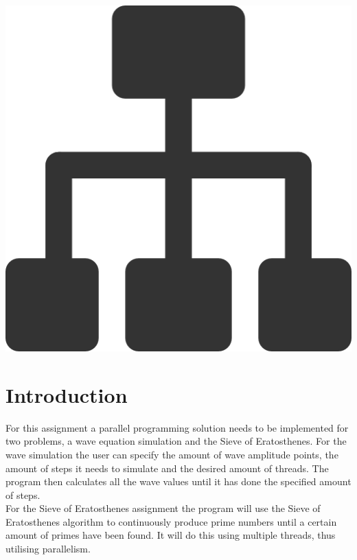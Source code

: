 \documentclass[a4paper,12px]{article}
\begin{document}
\vspace{2cm}
\begin{center}
    \includegraphics[width=(\textwidth/5*3)]{parallel_tasks}
\end{center}
\clearpage

\tableofcontents
\vspace{5mm}


\section{Introduction}

For this assignment a parallel programming solution needs to be implemented for
two problems, a wave equation simulation and the Sieve of Eratosthenes. For the
wave simulation the user can specify the amount of wave amplitude points, the
amount of steps it needs to simulate and the desired amount of threads. The
program then calculates all the wave values until it has done the specified
amount of steps.\\
For the Sieve of Eratosthenes assignment the program will use the Sieve of
Eratosthenes algorithm to continuously produce prime numbers until a certain
amount of primes have been found. It will do this using multiple threads, thus
utilising parallelism.
\end{document}
